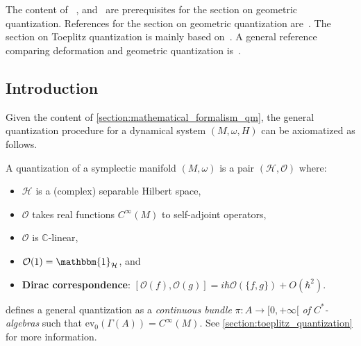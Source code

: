 \chapter{}\label{chapter:quantization}

    The content of ~,  and~ are prerequisites for the section on geometric quantization. References for the section on geometric quantization are~\citet{brylinski_loop_1993,tuynman_metaplectic_2016,bates_lectures_1997,camosso_prequantization_2021}. The section on Toeplitz quantization is mainly based on~\citet{hawkins_geometric_2000}. A general reference comparing deformation and geometric quantization is~\citet{hawkins_correspondence_1998}.

    \minitoc

\section{Introduction}

    Given the content of \cref{section:mathematical_formalism_qm}, the general quantization procedure for a dynamical system $(M,\omega,H)$ can be axiomatized as follows.
    \begin{method}\label{quantization:axioms}
        A quantization of a symplectic manifold $(M,\omega)$ is a pair $(\mathcal{H},\mathcal{O})$ where:
        \begin{itemize}
            \item $\mathcal{H}$ is a (complex) separable Hilbert space,
            \item $\mathcal{O}$ takes real functions $C^\infty(M)$ to self-adjoint operators,
            \item $\mathcal{O}$ is $\mathbb{C}$-linear,
            \item $\mathcal{O}(1) = \mathbbm{1}_{\mathcal{H}}$, and
            \item \textbf{Dirac correspondence}: $[\mathcal{O}(f),\mathcal{O}(g)] = i\hbar\mathcal{O}(\{f,g\}) + O(\hbar^2)$.
        \end{itemize}
    \end{method}
    \begin{remark}[$C^*$-bundles]\label{quantization:c_star_bundle_quantization}
         defines a general quantization as a \textit{continuous bundle} $\pi:A\rightarrow[0,+\infty[$ \textit{of $C^*$-algebras} such that $\mathrm{ev}_0(\Gamma(A))=C^\infty(M)$. See \cref{section:toeplitz_quantization} for more information.
    \end{remark}

